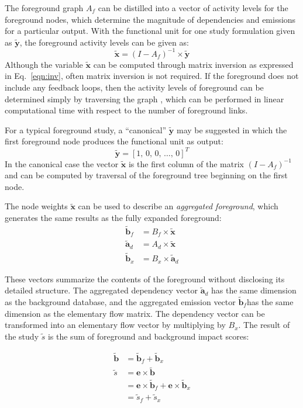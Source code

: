 The foreground graph $A_f$ can be distilled into a vector of activity levels for the foreground nodes, which determine the magnitude of dependencies and emissions for a particular output.  With the functional unit for one study formulation given as $\tilde{\mathbf{y}}$, the foreground activity levels can be given as:
\begin{equation}
\tilde{\mathbf{x}} = (I - A_f)^{-1} \times \tilde{\mathbf{y}}
\label{eqn:inv}
\end{equation}
Although the variable $\tilde{\mathbf{x}}$ can be computed through matrix inversion as expressed in Eq.~\ref{eqn:inv}, often matrix inversion is not required.  If the foreground does not include any feedback loops, then the activity levels of foreground can be determined simply by traversing the graph \citep{Bapat_LAA_2013}, which can be performed in linear computational time with respect to the number of foreground links.

For a typical foreground study, a ``canonical'' $\tilde{\mathbf{y}}$ may be suggested in which the first foreground node produces the functional unit as output:
\begin{equation}
\tilde{\mathbf{y}} =  [ 1,\, 0,\, 0 ,\,\ldots,\, 0]^{T}
\end{equation}
In the canonical case the vector $\tilde{\mathbf{x}}$ is the first column of the matrix $(I-A_f)^{-1}$  and can be computed by traversal of the foreground tree beginning on the first node.

The node weights $\tilde{\mathbf{x}}$ can be used to describe an \emph{aggregated foreground}, which generates the same results as the fully expanded foreground:
\begin{equation}
\begin{array}{rl}
    \tilde{\mathbf{b}}_f & = B_f \times \tilde{\mathbf{x}} \\
    \tilde{\mathbf{a}}_d & = A_d \times \tilde{\mathbf{x}} \\
    \tilde{\mathbf{b}}_x & = B_x \times \tilde{\mathbf{a}}_d
\end{array}
\label{eqn:agg}
\end{equation}

These vectors summarize the contents of the foreground without disclosing its detailed structure.  The aggregated dependency vector $\tilde{\mathbf{a}}_d$ has the same dimension as the background database, and the aggregated emission vector $\tilde{\mathbf{b}}_f $has the same dimension as the elementary flow matrix.  The dependency vector can be transformed into an elementary flow vector by multiplying by $B_x$.  The result of the study $\tilde{s}$ is the sum of foreground and background impact scores:

\begin{equation}
\begin{array}{rl}
   \tilde{\mathbf{b}} & = \tilde{\mathbf{b}}_f + \tilde{\mathbf{b}}_x \\
   \tilde{s} &= \mathbf{e} \times \tilde{\mathbf{b}} \\
   & = \mathbf{e} \times \tilde{\mathbf{b}}_f + \mathbf{e} \times \tilde{\mathbf{b}}_x \\
   &= \tilde{s}_f + \tilde{s}_x
\end{array}
\label{eqn:lci}
\end{equation}
